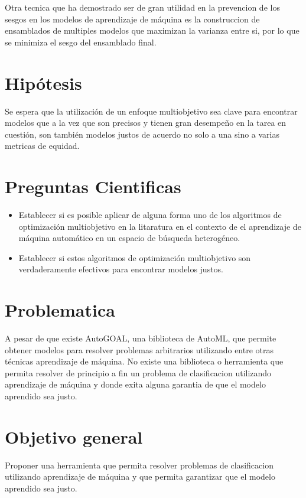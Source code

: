 Otra tecnica que ha demostrado ser de gran utilidad en la prevencion de los sesgos en los modelos de aprendizaje de máquina es la construccion de ensamblados de multiples modelos que maximizan la varianza entre si, por lo que se minimiza el sesgo del ensamblado final.

\section*{Hipótesis}

Se espera que la utilización de un enfoque multiobjetivo sea clave para encontrar modelos que a la vez que son precisos y tienen gran desempeño en la tarea en cuestión, son también modelos justos de acuerdo no solo a una sino a varias metricas de equidad.

\section*{Preguntas Cientificas}

\begin{itemize}
    \item Establecer si es posible aplicar de alguna forma uno de los algoritmos de optimización multiobjetivo en la litaratura en el contexto de el aprendizaje de máquina automático en un espacio de búsqueda heterogéneo.
    \item Establecer si estos algoritmos de optimización multiobjetivo son verdaderamente efectivos para encontrar modelos justos.
\end{itemize}

\section*{Problematica}

A pesar de que existe AutoGOAL, una biblioteca de AutoML, que permite obtener modelos para resolver problemas arbitrarios utilizando entre otras técnicas aprendizaje de máquina. No existe una biblioteca o herramienta que permita resolver de principio a fin un problema de clasificacion utilizando aprendizaje de máquina y donde exita alguna garantia de que el modelo aprendido sea justo.

\section*{Objetivo general}

Proponer una herramienta que permita resolver problemas de clasificacion utilizando aprendizaje de máquina y que permita garantizar que el modelo aprendido sea justo.

